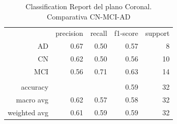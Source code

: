 \begin{table}[H]
    \centering
    \begin{tabular}{r r r r r}
        & precision & recall & f1-score & support \\
        AD & 0.67 & 0.50 & 0.57 & 8 \\
        CN & 0.62 & 0.50 & 0.56 & 10 \\
        MCI & 0.56 & 0.71 & 0.63 & 14 \\
        & & & & \\
        accuracy &  &  & 0.59 & 32 \\
        macro avg & 0.62 & 0.57 & 0.58 & 32 \\
        weighted avg & 0.61 & 0.59 & 0.59 & 32 \\
    \end{tabular}
    \caption{Classification Report del plano Coronal. Comparativa CN-MCI-AD}
    \label{tab:cr-coronal-cn-mci-ad}
\end{table}

